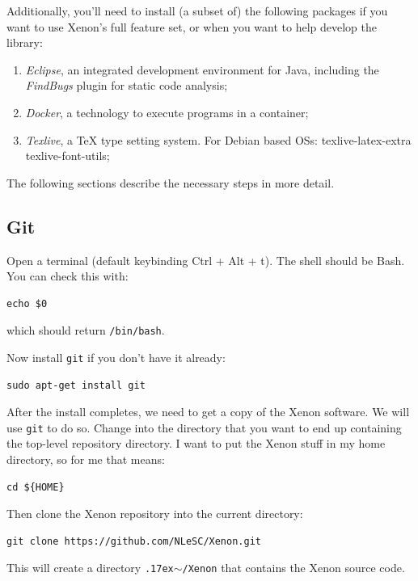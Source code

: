 \documentclass[12pt, a4paper, twoside,openany,titlepage]{article}
\newcommand{\mytilde}{\raise.17ex\hbox{$\scriptstyle\sim$}}
\begin{document}
Additionally, you'll need to install (a subset of) the following packages if you want to use Xenon's full feature set, or when you want to help develop the library:
\begin{enumerate}
\item{\textit{Eclipse}, an integrated development environment for Java, including the \textit{FindBugs} plugin for static code analysis;}
\item{\textit{Docker}, a technology to execute programs in a container;}
\item{\textit{Texlive}, a \TeX{} type setting system. For Debian based OSs: texlive-latex-extra texlive-font-utils;}
\end{enumerate}

The following sections describe the necessary steps in more detail.

\subsection{Git}

Open a terminal (default keybinding Ctrl + Alt + t). The shell should be Bash. You can check this with:
\begin{lstlisting}[style=basic,style=bash]
echo $0
\end{lstlisting} %
which should return \texttt{/bin/bash}.

Now install \texttt{git} if you don't have it already:
\begin{lstlisting}[style=basic,style=bash]
sudo apt-get install git
\end{lstlisting}

After the install completes, we need to get a copy of the Xenon software. We will use \texttt{git} to do so. Change into the directory that you want to end up containing the top-level repository directory. I want to put the Xenon stuff in my home directory, so for me that means:
\begin{lstlisting}[style=basic,style=bash]
cd ${HOME}
\end{lstlisting} %
Then clone the Xenon repository into the current directory:
\begin{lstlisting}[style=basic,style=bash]
git clone https://github.com/NLeSC/Xenon.git
\end{lstlisting}
This will create a directory \texttt{\mytilde{}/Xenon} that contains the Xenon source code.
\end{document}
